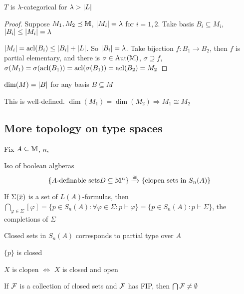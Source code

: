 \documentclass[11pt]{article}
\begin{document}
\begin{theorem}[]
\(T\) is \(\lambda\)-categorical for \(\lambda>\abs{L}\)
\end{theorem}

\begin{proof}
Suppose \(M_1,M_2\preceq\mathbb{M}\), \(\abs{M_i}=\lambda\) for \(i=1,2\). Take
basis \(B_i\subseteq M_i\), \(\abs{B_i}\le\abs{M_i}=\lambda\)

\(\abs{M_i}=\acl(B_i)\le\abs{B_i}+\abs{L}\). So \(\abs{B_i}=\lambda\). Take bijection \(f:B_1\to B_2\),
then \(f\) is partial elementary, and there
is \(\sigma\in\operatorname{\text{Aut}}(\mathbb{M})\), \(\sigma\supseteq f\), \(\sigma(M_1)=\sigma(\operatorname{acl}(B_1))=\operatorname{acl}(\sigma(B_1))=\operatorname{acl}(B_2)=M_2\)
\end{proof}

\begin{definition}[]
\(\dim(M)=\abs{B}\) for any basis \(B\subseteq M\)
\end{definition}

\begin{fact}[]
This is well-defined. \(\dim(M_1)=\dim(M_2)\Rightarrow M_1\cong M_2\)
\end{fact}
\subsection{More topology on type spaces}
\label{sec:org659ffd0}
Fix \(A\subseteq\mathbb{M}\), \(n\),

Iso of boolean algberas
\begin{equation*}
\{A\text{-definable sets}D\subseteq\mathbb{M}^n\}\xrightarrow{\cong}\{\text{clopen sets in }S_n(A)\}
\end{equation*}
\begin{remark}
If \(\Sigma(\barx)\) is a set of \(L(A)\)-formulas,
then \(\bigcap_{\varphi\in\Sigma}[\varphi]=\{p\in S_n(A):\forall\varphi\in\Sigma:p\vdash\varphi\}=\{p\in S_n(A):p\vdash\Sigma\}\), the completions of \(\Sigma\)

Closed sets in \(S_n(A)\) corresponds to partial type over \(A\)
\end{remark}

\begin{fact}[]
\(\{p\}\) is closed
\end{fact}

\begin{fact}[]
\(X\) is clopen \(\Leftrightarrow\) \(X\) is closed and open
\end{fact}

\begin{fact}[]
If \(\mathcal{F}\) is a collection of closed sets and \(\mathcal{F}\) has FIP, then \(\bigcap\mathcal{F}\neq\emptyset\)
\end{fact}
\end{document}
